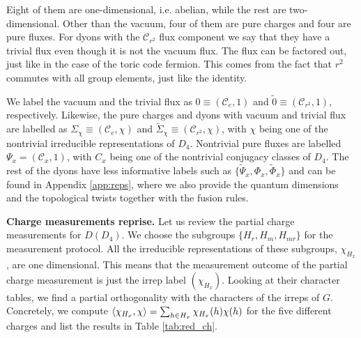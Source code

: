 \documentclass[a4paper,twocolumn,11pt]{quantumarticle}
\begin{document}
Eight of them are one-dimensional, i.e. abelian, while the rest are two-dimensional. Other than the vacuum, four of them are pure charges and four are pure fluxes. For dyons with the $\mathcal{C}_{r^2}$ flux component we say that they have a trivial flux even though it is not the vacuum flux. The flux can be factored out, just like in the case of the toric code fermion. This comes from the fact that $r^2$ commutes with all group elements, just like the identity. 



 We label the vacuum and the trivial flux as $0 \equiv (\mathcal{C}_e, 1)$ and $\tilde 0 \equiv (\mathcal{C}_{r^2}, 1)$, respectively. Likewise, the pure charges and dyons with vacuum and trivial flux are labelled as $\Sigma_{\chi} \equiv (\mathcal{C}_e, \chi)$ and $\tilde{\Sigma}_{\chi} \equiv (\mathcal{C}_{r^2}, \chi)$, with $\chi$ being one of the nontrivial irreducible representations of $D_4$.
Nontrivial pure fluxes are labelled $\Psi_x = (\mathcal{C}_x, 1)$, with $C_x$ being one of the nontrivial conjugacy classes of $D_4$. The rest of the dyons have less informative labels such as $\{\tilde{\Psi}_x, \Phi_x, \tilde{\Phi}_x\}$ and can be found in Appendix \ref{app:reps}, where we also provide the quantum dimensions and the topological twists together with the fusion rules. 

\textbf{Charge measurements reprise.}
Let us review the partial charge measurements for $D(D_4)$.
We choose the subgroups $\{H_r, H_m, H_{mr}\}$ for the measurement protocol. All the irreducible representations of these subgroups, $\chi_{H_x}$, are one dimensional. This means that the measurement outcome of the partial charge measurement is just the irrep label $(\chi_{H_x})$. Looking at their character tables, we find a partial orthogonality with the characters of the irreps of $G$. Concretely, we compute $ \braket{\chi_{H_x}, \chi} = \sum_{h\in H_x} \chi_{H_x}(h)\chi(h)$ for the five different charges and list the results in Table \ref{tab:red_ch}.
\end{document}
